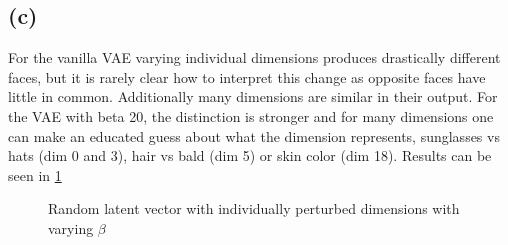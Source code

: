 \documentclass[11pt]{article}
\numberwithin{equation}{section}
\begin{document}
\newpage
\subsection{(c)}

For the vanilla VAE varying individual dimensions produces drastically different
faces, but it is rarely clear how to interpret this change as opposite faces have
little in common. Additionally many dimensions are similar in their output. For
the VAE with beta 20, the distinction is stronger and for many dimensions one can
make an educated guess about what the dimension represents, sunglasses vs hats
(dim 0 and 3), hair vs bald (dim 5) or skin color (dim 18).
Results can be seen in \ref{fig:variation}

\begin{figure}[h]
  \caption{Random latent vector with individually perturbed dimensions with varying $\beta$ }
  \label{fig:samples}
  \label{fig:variation}
    \centering
    \begin{minipage}{0.4\textwidth}

\end{minipage}
\end{figure}
\end{document}
